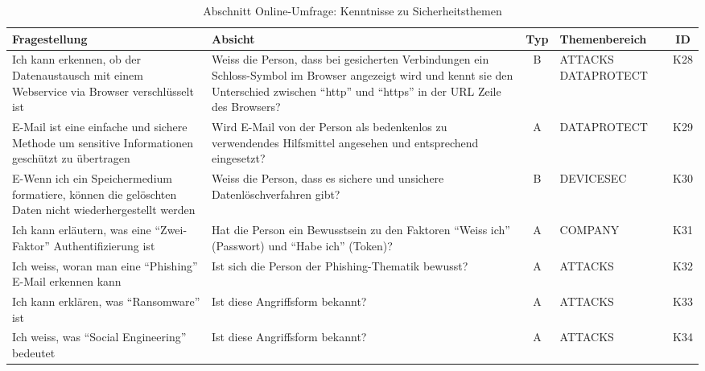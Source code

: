 \documentclass[../../main.tex]{subfiles}
\begin{document}
\begin{table}[H]
\tablefontsize	
\centering
\caption{Abschnitt Online-Umfrage: Kenntnisse zu Sicherheitsthemen}
\label{Kenntnisse zu Sicherheitsthemen}
\begin{tabular}{ |p{5.5cm}|p{5.5cm}|c|p{2.5cm}|c|}

\hline
\tableheaderbgcolor
\textbf{Fragestellung} & \textbf{Absicht} & \textbf{Typ} & \textbf{Themenbereich} & \textbf{ID}\\ 
\hline

Ich kann erkennen, ob der Datenaustausch mit einem Webservice via Browser verschlüsselt ist & Weiss die Person, dass bei gesicherten Verbindungen ein Schloss-Symbol im Browser angezeigt wird und kennt sie  den Unterschied zwischen "`http"' und "`https"' in der URL Zeile des Browsers? & B & ATTACKS \newline DATAPROTECT & K28 \\
\hline

E-Mail ist eine einfache und sichere Methode um sensitive Informationen geschützt zu übertragen & Wird E-Mail von der Person als bedenkenlos zu verwendendes Hilfsmittel angesehen und entsprechend eingesetzt? & A & DATAPROTECT & K29 \\
\hline

E-Wenn ich ein Speichermedium formatiere, können die gelöschten Daten nicht wiederhergestellt werden & Weiss die Person, dass es sichere und unsichere Datenlöschverfahren gibt? & B & DEVICESEC & K30 \\
\hline

Ich kann erläutern, was eine "`Zwei-Faktor"' Authentifizierung ist & Hat die Person ein Bewusstsein zu den Faktoren "`Weiss ich"' (Passwort) und "`Habe ich"' (Token)? & A & COMPANY & K31 \\
\hline

Ich weiss, woran man eine "`Phishing"' E-Mail erkennen kann & Ist sich die Person der Phishing-Thematik bewusst? & A & ATTACKS & K32 \\
\hline

Ich kann erklären, was "`Ransomware"' ist & Ist diese Angriffsform bekannt? & A & ATTACKS & K33 \\
\hline

Ich weiss, was "`Social Engineering"' bedeutet & Ist diese Angriffsform bekannt? & A & ATTACKS & K34 \\
\hline

\end{tabular}
\end{table}
\end{document}
